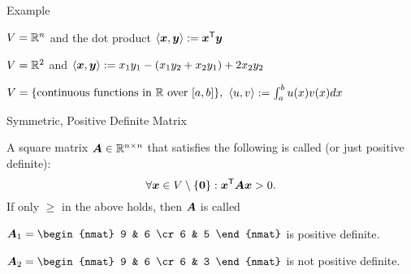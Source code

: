 \documentclass[fleqn,aspectratio=169]{beamer}
\begin{document}
\begin{frame}{Example}

\plitemsep 0.3in

\bci 

\item \exam $V={\mathbb R}^n$ and the dot product $\left\langle \bm{x}, \bm{y} \right\rangle := {\bm{x}}^{\mathsf{T}}\bm{y}$

\item \exam $V={\mathbb R}^2$ and $\left\langle \bm{x}, \bm{y} \right\rangle := x_1y_1 - (x_1y_2 + x_2y_1) + 2x_2y_2$

\item \exam $V=\{\text{continuous functions in ${\mathbb R}$ over $[a,b]$} \},$ $\left\langle u, v \right\rangle := \int_a^b u(x)v(x) dx$
\eci
\end{frame}

\begin{frame}{Symmetric, Positive Definite Matrix}

\plitemsep 0.1in

\bci 
\item A square matrix $\bm{A} \in {\mathbb R}^{n \times n}$ that satisfies the following is called  (or just positive definite): 
$$
\forall \bm{x} \in V \setminus \{\bm{0} \}: {\bm{x}}^{\mathsf{T}} \bm{A} \bm{x} > 0.
$$
If only $\ge$ in the above holds, then $\bm{A}$ is called  

\bigskip
\item $\mat{A}_1 = \begin{nmat}
9 & 6 \cr
6 & 5
\end{nmat}
$ is positive definite.

\item $\mat{A}_2 = \begin{nmat}
9 & 6 \cr
6 & 3
\end{nmat}
$ is not positive definite.



\eci
\end{frame}
\end{document}
